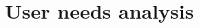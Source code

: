 \documentclass[]{VUMIFTemplateClass}
\begin{document}
\section{User needs analysis}




\end{document}
